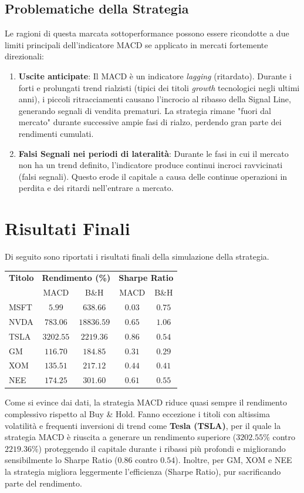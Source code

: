 \documentclass[11pt, a4paper]{report} %
\begin{document}
\subsection{Problematiche della Strategia}
Le ragioni di questa marcata sottoperformance possono essere ricondotte a due limiti principali dell'indicatore MACD se applicato in mercati fortemente direzionali:

\begin{enumerate}
    \item \textbf{Uscite anticipate}: Il MACD è un indicatore \textit{lagging} (ritardato). Durante i forti e prolungati trend rialzisti (tipici dei titoli \textit{growth} tecnologici negli ultimi anni), i piccoli ritracciamenti causano l'incrocio al ribasso della Signal Line, generando segnali di vendita prematuri. La strategia rimane "fuori dal mercato" durante successive ampie fasi di rialzo, perdendo gran parte dei rendimenti cumulati.
    \item \textbf{Falsi Segnali nei periodi di lateralità}: Durante le fasi in cui il mercato non ha un trend definito, l'indicatore produce continui incroci ravvicinati (falsi segnali). Questo erode il capitale a causa delle continue operazioni in perdita e dei ritardi nell'entrare a mercato.
\end{enumerate}

\section{Risultati Finali}
Di seguito sono riportati i risultati finali della simulazione della strategia. 

\begin{table}[H]
\centering
\small
\begin{tabular}{l|cc|cc}
\hline
\textbf{Titolo} & \multicolumn{2}{c|}{\textbf{Rendimento (\%)}} & \multicolumn{2}{c}{\textbf{Sharpe Ratio}} \\
 & MACD & B\&H & MACD & B\&H \\
\hline
MSFT  & $5.99$ & $638.66$ & $0.03$ & $0.75$ \\
NVDA  & $783.06$ & $18836.59$ & $0.65$ & $1.06$ \\
TSLA  & $3202.55$ & $2219.36$ & $0.86$ & $0.54$ \\
GM    & $116.70$ & $184.85$ & $0.31$ & $0.29$ \\
XOM   & $135.51$ & $217.12$ & $0.44$ & $0.41$ \\
NEE   & $174.25$ & $301.60$ & $0.61$ & $0.55$ \\
\hline
\end{tabular}
\end{table}

Come si evince dai dati, la strategia MACD riduce quasi sempre il rendimento complessivo rispetto al Buy \& Hold. Fanno eccezione i titoli con altissima volatilità e frequenti inversioni di trend come \textbf{Tesla (TSLA)}, per il quale la strategia MACD è riuscita a generare un rendimento superiore ($3202.55\%$ contro $2219.36\%$) proteggendo il capitale durante i ribassi più profondi e migliorando sensibilmente lo Sharpe Ratio ($0.86$ contro $0.54$). Inoltre, per GM, XOM e NEE la strategia migliora leggermente l'efficienza (Sharpe Ratio), pur sacrificando parte del rendimento.
\end{document}

